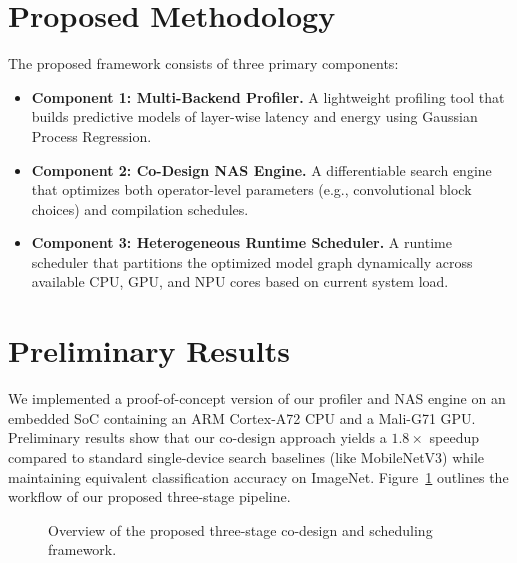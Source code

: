 \documentclass[11pt,a4paper]{article}
\begin{document}
\section{Proposed Methodology}
The proposed framework consists of three primary components:
\begin{itemize}
    \item \textbf{Component 1: Multi-Backend Profiler.} A lightweight profiling tool that builds predictive models of layer-wise latency and energy using Gaussian Process Regression.
    \item \textbf{Component 2: Co-Design NAS Engine.} A differentiable search engine that optimizes both operator-level parameters (e.g., convolutional block choices) and compilation schedules.
    \item \textbf{Component 3: Heterogeneous Runtime Scheduler.} A runtime scheduler that partitions the optimized model graph dynamically across available CPU, GPU, and NPU cores based on current system load.
\end{itemize}

\section{Preliminary Results}
We implemented a proof-of-concept version of our profiler and NAS engine on an embedded SoC containing an ARM Cortex-A72 CPU and a Mali-G71 GPU. Preliminary results show that our co-design approach yields a $1.8\times$ speedup compared to standard single-device search baselines (like MobileNetV3) while maintaining equivalent classification accuracy on ImageNet. Figure~\ref{fig:pipeline} outlines the workflow of our proposed three-stage pipeline.

\begin{figure}[htbp]
    \centering
    \caption{Overview of the proposed three-stage co-design and scheduling framework.}
    \label{fig:pipeline}
\end{figure}
\end{document}
